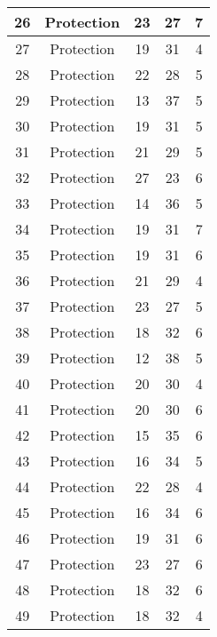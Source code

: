 \documentclass[results.tex]{subfiles}
\begin{document}
\begin{center}
\begin{tabular}{| c || c | c | c | c |}
    \hline
    26 & Protection & 23 & 27 & 7 \\ 
    \hline
    27 & Protection & 19 & 31 & 4 \\ 
    \hline
    28 & Protection & 22 & 28 & 5 \\ 
    \hline
    29 & Protection & 13 & 37 & 5 \\ 
    \hline
    30 & Protection & 19 & 31 & 5 \\ 
    \hline
    31 & Protection & 21 & 29 & 5 \\ 
    \hline
    32 & Protection & 27 & 23 & 6 \\ 
    \hline
    33 & Protection & 14 & 36 & 5 \\ 
    \hline
    34 & Protection & 19 & 31 & 7 \\ 
    \hline
    35 & Protection & 19 & 31 & 6 \\ 
    \hline
    36 & Protection & 21 & 29 & 4 \\ 
    \hline
    37 & Protection & 23 & 27 & 5 \\ 
    \hline
    38 & Protection & 18 & 32 & 6 \\ 
    \hline
    39 & Protection & 12 & 38 & 5 \\ 
    \hline
    40 & Protection & 20 & 30 & 4 \\ 
    \hline
    41 & Protection & 20 & 30 & 6 \\ 
    \hline
    42 & Protection & 15 & 35 & 6 \\ 
    \hline
    43 & Protection & 16 & 34 & 5 \\ 
    \hline
    44 & Protection & 22 & 28 & 4 \\ 
    \hline
    45 & Protection & 16 & 34 & 6 \\ 
    \hline
    46 & Protection & 19 & 31 & 6 \\ 
    \hline
    47 & Protection & 23 & 27 & 6 \\ 
    \hline
    48 & Protection & 18 & 32 & 6 \\ 
    \hline
    49 & Protection & 18 & 32 & 4 \\ 
    \hline   \end{tabular}
\end{center}
\end{document}
